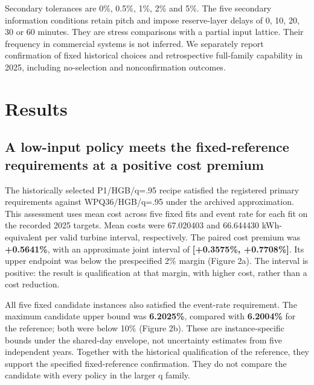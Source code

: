 \documentclass[
  british,
  11pt,
]{article}
\begin{document}
Secondary tolerances are 0\%, 0.5\%, 1\%, 2\% and 5\%. The five
secondary information conditions retain pitch and impose reserve-layer
delays of 0, 10, 20, 30 or 60 minutes. They are stress comparisons with
a partial input lattice. Their frequency in commercial systems is not
inferred. We separately report confirmation of fixed historical choices
and retrospective full-family capability in 2025, including no-selection
and nonconfirmation outcomes.

\section{Results}\label{results}

\subsection{A low-input policy meets the fixed-reference requirements at
a positive cost
premium}\label{a-low-input-policy-meets-the-fixed-reference-requirements-at-a-positive-cost-premium}

The historically selected P1/HGB/q=.95 recipe satisfied the registered
primary requirements against WPQ36/HGB/q=.95 under the archived
approximation. This assessment uses mean cost across five fixed fits and
event rate for each fit on the recorded 2025 targets. Mean costs were
67.020403 and 66.644430 kWh-equivalent per valid turbine interval,
respectively. The paired cost premium was \textbf{+0.5641\%}, with an
approximate joint interval of \textbf{{[}+0.3575\%, +0.7708\%{]}}. Its
upper endpoint was below the prespecified 2\% margin (Figure 2a). The
interval is positive: the result is qualification at that margin, with
higher cost, rather than a cost reduction.

All five fixed candidate instances also satisfied the event-rate
requirement. The maximum candidate upper bound was \textbf{6.2025\%},
compared with \textbf{6.2004\%} for the reference; both were below 10\%
(Figure 2b). These are instance-specific bounds under the shared-day
envelope, not uncertainty estimates from five independent years.
Together with the historical qualification of the reference, they
support the specified fixed-reference confirmation. They do not compare
the candidate with every policy in the larger q family.
\end{document}
